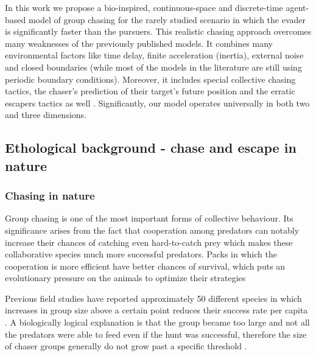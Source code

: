 \documentclass[12pt,a4paper,final]{iopart}
\begin{document}
In this work we propose a bio-inspired, continuous-space and discrete-time agent-based model of group chasing for the rarely studied scenario in which the evader is significantly faster than the pursuers. This realistic chasing approach overcomes many weaknesses of the previously published models. It combines many environmental factors like time delay, finite acceleration (inertia), external noise and closed boundaries (while most of the models in the literature are still using periodic boundary conditions). Moreover, it includes special collective chasing tactics, the chaser's prediction of their target's future position and the erratic escapers tactics as well \cite{angelani2012collective, lee2006predator, kamimura2010group, jin2010pursuit, saito2016group, ohira2015mathematical}. Significantly, our model operates universally in both two and three dimensions.





\subsection{Ethological background - chase and escape in nature}

\subsubsection{Chasing in nature}

Group chasing is one of the most important forms of collective behaviour. Its significance arises from the fact that cooperation among predators can notably increase their chances of catching even hard-to-catch prey which makes these collaborative species much more successful predators. Packs in which the cooperation is more efficient have better chances of survival, which puts an evolutionary pressure on the animals to optimize their strategies \cite{packer1988evolution, boesch1994cooperative, mech2010wolves, kruuk1972spotted}

Previous field studies have reported approximately 50 different species in which increases in group size above a certain point reduces their success rate per capita \cite{packer1988evolution}. A biologically logical explanation is that the group became too large and not all the predators were able to feed even if the hunt was successful, therefore the size of chaser groups generally do not  grow past a specific threshold \cite{stander1993hunting}. 
\end{document}
